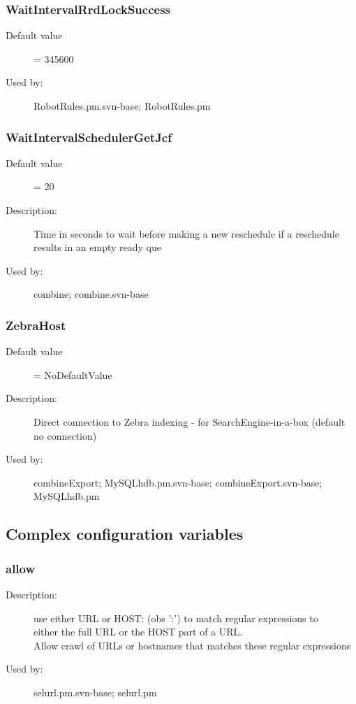 \subsubsection{WaitIntervalRrdLockSuccess}
\label{WaitIntervalRrdLockSuccess}
\begin{description}
\item[Default value] = 345600
\item[Used by:] RobotRules.pm.svn-base; RobotRules.pm
\end{description}
\subsubsection{WaitIntervalSchedulerGetJcf}
\label{WaitIntervalSchedulerGetJcf}
\begin{description}
\item[Default value] = 20
\item[Description:] Time in seconds to wait before making a new reschedule if a reschedule results in an empty ready que
\item[Used by:] combine; combine.svn-base
\end{description}
\subsubsection{ZebraHost}
\label{ZebraHost}
\begin{description}
\item[Default value] = NoDefaultValue
\item[Description:] Direct connection to Zebra indexing - for SearchEngine-in-a-box (default no connection)
\item[Used by:] combineExport; MySQLhdb.pm.svn-base; combineExport.svn-base; MySQLhdb.pm
\end{description}
\subsection{Complex configuration variables}
\subsubsection{allow}
\label{allow}
\begin{description}
\item[Description:] use either URL or HOST: (obs ':') to match regular expressions to \\  either the full URL or the HOST part of a URL. \\ Allow crawl of URLs or hostnames that matches these regular expressions
\item[Used by:] selurl.pm.svn-base; selurl.pm
\end{description}
